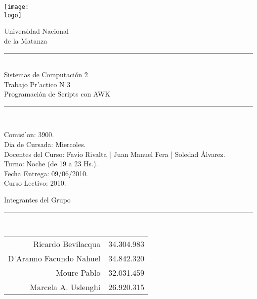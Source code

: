 

\newcommand{\materia}{Sistemas de Computaci\'on 2}
\newcommand{\team}{Grupo N$^{\circ}$63}
\newcommand{\comision}{3900}
\newcommand{\diacursada}{Miercoles}
\newcommand{\turno}{Noche (de 19 a 23 Hs.)}
\newcommand{\anio}{2010}
\newcommand{\fecha}{09/06/2010}
\newcommand{\numtp}{3}
\newcommand{\nomtp}{Programaci\'on de Scripts con AWK}
\newcommand{\docentes}{Favio Rivalta | Juan Manuel Fera | Soledad \'Alvarez}
\newcommand{\logo}{/home/ric/Documentos/Facultad/Varios/logoUnlam.png}

%
\thispagestyle{empty}

\begin{center}

 \texttt{[image: \\logo]}
 

\huge{Universidad Nacional\\de la Matanza}\\
\end{center}


\begin{center}
\rule{30mm}{.1pt}\\
\huge{\materia}\\
\huge{Trabajo Pr'actico N$^{\circ}$\numtp\\\nomtp}\\
\rule[5mm]{30mm}{.1pt}\\
\end{center}
Comisi'on: \comision.\\
Dia de Cursada: \diacursada.\\
Docentes del Curso: \docentes.\\
Turno: \turno.\\
Fecha Entrega: \fecha.\\
Curso Lectivo: \anio.



\begin{center}

\Large{Integrantes del Grupo}\\
\rule[2.5mm]{15mm}{.1pt}\\

\begin{tabular}{r|r}
Ricardo Bevilacqua & 34.304.983\\
D\'{ }Aranno Facundo Nahuel & 34.842.320\\
Moure Pablo & 32.031.459\\
Marcela A. Uslenghi & 26.920.315
\end{tabular}



\end{center}
\newpage


%

